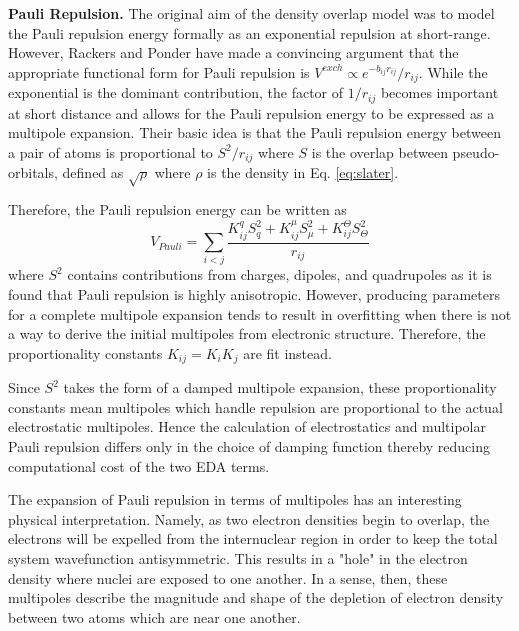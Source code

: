 \documentclass[journal=jctcce,manuscript=article]{achemso}
\begin{document}
\textbf{Pauli Repulsion.} The original aim of the density overlap model was to model the
Pauli repulsion energy formally as an exponential
repulsion at short-range.\cite{wallqvist1989new,wheatley1990overlap,gordon1996approximate} However, Rackers and Ponder have made a convincing argument that the appropriate
functional form for Pauli repulsion is 
$V^{exch}\propto e^{-b_{ij}r_{ij}}/r_{ij}$.\cite{rackers2019classical,rackers2021polarizable}
While the exponential is the dominant contribution, the factor of $1/r_{ij}$
becomes important at short distance and allows for the Pauli repulsion energy
to be expressed as a multipole expansion. Their basic idea is that the Pauli repulsion energy
between a pair of atoms is proportional to $S^2/r_{ij}$ where $S$ is the overlap between pseudo-orbitals, defined as $\sqrt{\rho}$ where $\rho$ is the density in Eq. \ref{eq:slater}.

Therefore, the Pauli repulsion energy can be written as
\begin{equation}
  V_{Pauli}=\sum_{i<j}\frac{K_{ij}^q S^2_{q}+K_{ij}^\mu S^2_{\mu}+K_{ij}^\Theta S^2_{\Theta}}{r_{ij}}
\label{eq:pauli}
\end{equation}
\noindent
where $S^2$ contains contributions from charges, dipoles, and quadrupoles as it is found that Pauli repulsion is highly anisotropic. However, producing parameters for a complete multipole expansion
tends to result in overfitting when there is not a way to derive the initial multipoles
from electronic structure. Therefore, the proportionality constants $K_{ij}=K_iK_j$ are fit instead.

Since $S^2$ takes the form of a damped multipole expansion\cite{rackers2019classical}, these proportionality
constants mean multipoles which handle repulsion are proportional to the actual electrostatic
multipoles. Hence the calculation of electrostatics and
multipolar Pauli repulsion differs only in the choice of damping function thereby reducing computational cost
of the two EDA terms.

The expansion of Pauli repulsion in terms of multipoles has an interesting physical interpretation.
Namely, as two electron densities begin to overlap, the electrons will be expelled
from the internuclear region in order to keep the total system wavefunction antisymmetric.
This results in a "hole" in the electron density where nuclei are exposed to one another.
In a sense, then, these multipoles describe the magnitude and shape of the depletion of electron density between two atoms which are near one another. 
\end{document}
